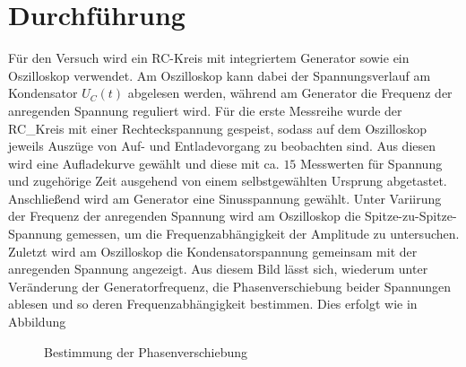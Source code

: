 \section{Durchführung}
Für den Versuch wird ein RC-Kreis mit integriertem Generator sowie ein Oszilloskop verwendet. Am Oszilloskop kann dabei der
Spannungsverlauf am Kondensator $U_C(t)$ abgelesen werden, während am Generator die Frequenz der anregenden Spannung reguliert wird.
Für die erste Messreihe wurde der RC_Kreis mit einer Rechteckspannung gespeist, sodass auf dem Oszilloskop jeweils Auszüge von Auf- und Entladevorgang 
zu beobachten sind. Aus diesen wird eine Aufladekurve gewählt und diese mit ca. $15$ Messwerten für Spannung und zugehörige Zeit ausgehend von einem 
selbstgewählten Ursprung abgetastet. \\
Anschließend wird am Generator eine Sinusspannung gewählt. Unter Variirung der Frequenz der anregenden Spannung wird am Oszilloskop
die Spitze-zu-Spitze-Spannung gemessen, um die Frequenzabhängigkeit der Amplitude zu untersuchen. \\
Zuletzt wird am Oszilloskop die Kondensatorspannung gemeinsam mit der anregenden Spannung angezeigt. Aus diesem Bild lässt sich, wiederum
unter Veränderung der Generatorfrequenz, die Phasenverschiebung beider Spannungen ablesen und so deren Frequenzabhängigkeit bestimmen.
Dies erfolgt wie in Abbildung 
\begin{figure}
\caption{Bestimmung der Phasenverschiebung}
\end{figure}
